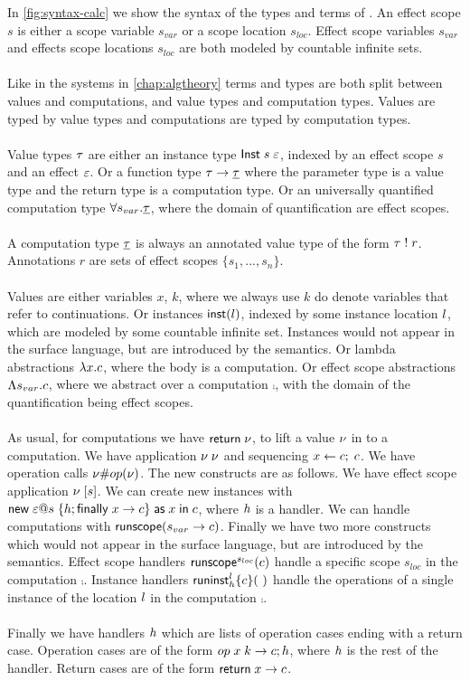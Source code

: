 {In \cref{fig:syntax-calc} we show the syntax of the types and terms of \lang{}.
An effect scope $s$ is either a scope variable $s_{var}$ or a scope location $s_{loc}$.
Effect scope variables $s_{var}$ and effects scope locations $s_{loc}$ are both modeled by countable infinite sets.
\\\\
Like in the systems in \cref{chap:algtheory} terms and types are both split between values and computations, and value types and computation types.
Values are typed by value types and computations are typed by computation types.
\\\\
Value types $\tau$ are either an instance type $\mathsf{Inst} \; s \; \varepsilon$, indexed by an effect scope $s$ and an effect $\varepsilon$.
Or a function type $\tau \rightarrow \underline{\tau}$ where the parameter type is a value type and the return type is a computation type.
Or an universally quantified computation type $\forall s_{var} . \underline{\tau}$, where the domain of quantification are effect scopes.
\\\\
A computation type $\underline{\tau}$ is always an annotated value type of the form $\tau \; ! \; r$.
Annotations $r$ are sets of effect scopes $\{ s_1, ..., s_n \}$.
\\\\
Values are either variables $x$, $k$, where we always use $k$ do denote variables that refer to continuations.
Or instances $\mathsf{inst}(l)$, indexed by some instance location $l$, which are modeled by some countable infinite set.
Instances would not appear in the surface language, but are introduced by the semantics.
Or lambda abstractions $\lambda x . c$, where the body is a computation.
Or effect scope abstractions $\Lambda s_{var} . c$, where we abstract over a computation $\comp$, with the domain of the quantification being effect scopes.
\\\\
As usual, for computations we have $\mathsf{return} \; \nu$, to lift a value $\nu$ in to a computation.
We have application $\nu \; \nu$ and sequencing $x \leftarrow c ;\; c$.
We have operation calls $\nu \# op(\nu)$.
The new constructs are as follows.
We have effect scope application $\nu \; [ s ]$.
We can create new instances with $\mathsf{new} \; \varepsilon @ s \; \{ h ; \mathsf{finally} \; x \rightarrow c \} \; \mathsf{as} \; x \;\mathsf{in}\; c$, where $h$ is a handler.
We can handle computations with $\mathsf{runscope} ( s_{var} \rightarrow c )$.
Finally we have two more constructs which would not appear in the surface language, but are introduced by the semantics.
Effect scope handlers $\mathsf{runscope}^{s_{loc}} ( c )$ handle a specific scope $s_{loc}$ in the computation $\comp$.
Instance handlers $\chandlei{\loc}{\handler}{\comp}$ handle the operations of a single instance of the location $l$ in the computation $\comp$.
\\\\
Finally we have handlers $h$ which are lists of operation cases ending with a return case.
Operation cases are of the form $op \; x \; k \rightarrow c ; h$, where $h$ is the rest of the handler.
Return cases are of the form $\mathsf{return} \; x \rightarrow c$.

}
